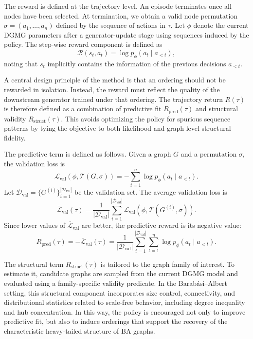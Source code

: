 The reward is defined at the trajectory level. An episode terminates once all nodes have been selected. At termination, we obtain a valid node permutation $\sigma=(a_1,\ldots,a_n)$ defined by the sequence of actions in $\tau$. Let $\phi$ denote the current DGMG parameters after a generator-update stage using sequences induced by the policy. The step-wise reward component is defined as
\begin{equation}
    \mathcal{R}(s_t,a_t) = \log p_\phi(a_t \mid a_{<t}),
\end{equation}
noting that $s_t$ implicitly contains the information of the previous decisions $a_{<t}$.

A central design principle of the method is that an ordering should not be rewarded in isolation. Instead, the reward must reflect the quality of the downstream generator trained under that ordering. The trajectory return $R(\tau)$ is therefore defined as a combination of predictive fit $R_{\mathrm{pred}}(\tau)$ and structural validity $R_{\mathrm{struct}}(\tau)$. This avoids optimizing the policy for spurious sequence patterns by tying the objective to both likelihood and graph-level structural fidelity.

The predictive term is defined as follows. Given a graph $G$ and a permutation $\sigma$, the validation loss is
\begin{equation}
    \mathcal{L}_{\mathrm{val}}(\phi,\mathcal{T}(G,\sigma))
    = -\sum_{t=1}^{n}\log p_\phi(a_t\mid a_{<t}).
\end{equation}
Let $\mathcal{D}_{\mathrm{val}}=\{G^{(i)}\}_{i=1}^{|\mathcal{D}_{\mathrm{val}}|}$ be the validation set. The average validation loss is
\begin{equation}
    \overline{\mathcal{L}}_{\mathrm{val}}(\tau)
    = \frac{1}{|\mathcal{D}_{\mathrm{val}}|}\sum_{i=1}^{|\mathcal{D}_{\mathrm{val}}|}\mathcal{L}_{\mathrm{val}}\!\left(\phi,\mathcal{T}(G^{(i)},\sigma)\right).
\end{equation}
Since lower values of $\overline{\mathcal{L}}_{\mathrm{val}}$ are better, the predictive reward is its negative value:
\begin{equation}
    R_{\mathrm{pred}}(\tau)
    = -\overline{\mathcal{L}}_{\mathrm{val}}(\tau)
    = \frac{1}{|\mathcal{D}_{\mathrm{val}}|}\sum_{i=1}^{|\mathcal{D}_{\mathrm{val}}|}\sum_{t=1}^{n}\log p_\phi(a_t\mid a_{<t}).
\end{equation}

The structural term $R_{\mathrm{struct}}(\tau)$ is tailored to the graph family of interest. To estimate it, candidate graphs are sampled from the current DGMG model and evaluated using a family-specific validity predicate. In the Barab\'asi--Albert setting, this structural component incorporates size control, connectivity, and distributional statistics related to scale-free behavior, including degree inequality and hub concentration. In this way, the policy is encouraged not only to improve predictive fit, but also to induce orderings that support the recovery of the characteristic heavy-tailed structure of BA graphs.

